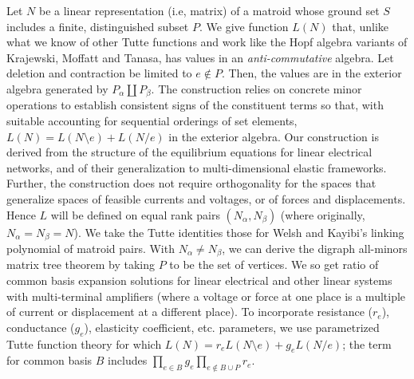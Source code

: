 \documentclass{article}
\begin{document}
Let $N$ be a linear representation (i.e, matrix) of a matroid whose ground
set $S$ includes a finite, distinguished subset $P$.  We give
function $L(N)$ that, unlike what we know of other Tutte functions and
work like the Hopf algebra variants
of
Krajewski, Moffatt and Tanasa,
has values
in an \emph{anti-commutative} algebra. Let deletion and contraction be limited
to $e\not\in P$.  Then, the values are in the exterior algebra generated
by $P_\alpha \coprod P_\beta$.  The construction relies on concrete minor operations
to establish consistent signs of the constituent terms so that, with suitable
accounting for sequential orderings of set elements, $L(N)=L(N\setminus e)+L(N/e)$
in the exterior algebra. Our construction is derived from the structure of
the equilibrium equations for linear electrical networks, and of their generalization
to multi-dimensional elastic frameworks.  Further, the construction does not
require orthogonality for the spaces that generalize spaces of feasible currents and voltages,
or of forces and displacements.  Hence $L$ will be defined on equal rank pairs $(N_\alpha, N_\beta)$
(where originally, $N_\alpha=N_\beta=N$).  We take the Tutte identities those for Welsh and Kayibi's
linking polynomial of matroid pairs. With $N_\alpha\neq N_\beta$, we can derive the digraph
all-minors matrix tree theorem by taking $P$ to be the set of vertices.  We so
get ratio of common basis expansion solutions for
linear electrical and other linear systems with multi-terminal amplifiers (where a voltage or force
at one place is a multiple of current or displacement at a different place).  To incorporate
resistance ($r_e$), conductance ($g_e$), elasticity coefficient, etc. parameters, we use parametrized
Tutte function theory
for which $L(N)=r_e L(N\setminus e)+ g_e L(N/e)$; the
term for common basis $B$ includes
$\prod _{e\in B} g_e \prod _{e\not\in B\cup P} r_e$.
\end{document}
